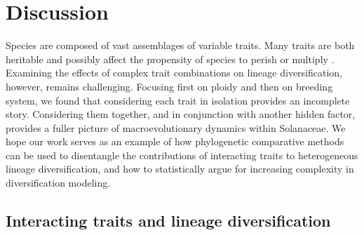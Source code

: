 \section{Discussion}

%
Species are composed of vast assemblages of variable traits.
Many traits are both heritable and possibly affect the propensity of species to perish or multiply \citep{lewontin_1970}.
Examining the effects of complex trait combinations on lineage diversification, however, remains challenging.
%
Focusing first on ploidy and then on breeding system, we found that considering each trait in isolation provides an incomplete story.
Considering them together, and in conjunction with another hidden factor, provides a fuller picture of macroevolutionary dynamics within Solanaceae.
We hope our work serves as an example of how phylogenetic comparative methods can be used to disentangle the contributions of interacting traits to heterogeneous lineage diversification, and how to statistically argue for increasing complexity in diversification modeling.

\subsection{Interacting traits and lineage diversification} 

